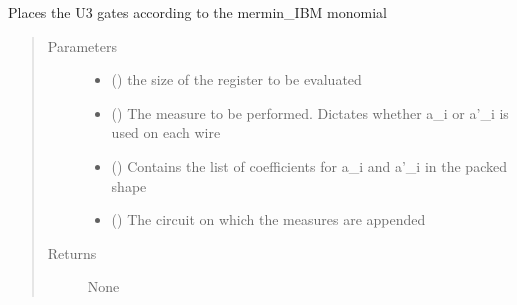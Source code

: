 \documentclass[letterpaper,10pt,english]{sphinxmanual}
\begin{document}
\begin{fulllineitems}
\label{\detokenize{basis_change:mermin_on_qiskit.basis_change.U3_gates_placement}}
Places the U3 gates according to the mermin\_IBM monomial
\begin{quote}\begin{description}
\item[{Parameters}] \leavevmode\begin{itemize}
\item {} 
 () \textendash{} the size of the register to be evaluated

\item {} 
 () \textendash{} The measure to be performed. Dictates whether a\_i or
a’\_i is used on each wire

\item {} 
 (\sphinxstyleliteralemphasis{\sphinxupquote{{[}}}\sphinxstyleliteralemphasis{\sphinxupquote{{[}}}\sphinxstyleliteralemphasis{\sphinxupquote{{]}}}\sphinxstyleliteralemphasis{\sphinxupquote{{]}}}) \textendash{} Contains the list of coefficients for 
a\_i and a’\_i in the packed shape

\item {} 
 () \textendash{} The circuit on which the measures are
appended

\end{itemize}

\item[{Returns}] \leavevmode
None

\end{description}\end{quote}

\end{fulllineitems}

\end{document}
